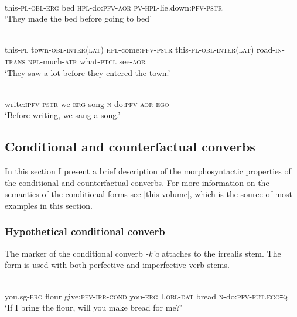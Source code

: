 ﻿\documentclass[output=paper]{langsci/langscibook}
\begin{document}
\ex \label{ex:8:18} %
\\
this-\textsc{pl}-\textsc{obl}-\textsc{erg} bed \textsc{hpl}-do:\textsc{pfv}-\textsc{aor} \textsc{pv}-\textsc{hpl}-lie.down:\textsc{pfv}-\textsc{pstr}\\
\glt `They made the bed before going to bed'

\ex \label{ex:8:19} %
\\
this-\textsc{pl} town-\textsc{obl}-\textsc{inter(lat)} \textsc{hpl}-come:\textsc{pfv}-\textsc{pstr} this-\textsc{pl}-\textsc{obl}-\textsc{inter}(\textsc{lat}) road-\textsc{in}-\textsc{trans} \textsc{npl}-much-\textsc{atr} what-\textsc{ptcl} see-\textsc{aor}\\
\glt `They saw a lot before they entered the town.'

\ex \label{ex:8:20} %
\\
write:\textsc{ipfv}-\textsc{pstr} we-\textsc{erg} song \textsc{n}-do:\textsc{pfv}-\textsc{aor}-\textsc{ego}\\
\glt `Before writing, we sang a song.'
\z

\subsection{Conditional and counterfactual converbs}

In this section I present a brief description of the morphosyntactic
properties of the conditional and counterfactual converbs. For more
information on the semantics of the conditional forms see \citet{dobrushina2019} [this volume],
which is the source of most examples in this section.

\subsubsection{Hypothetical conditional converb}

The marker of the conditional converb \emph{-k'a} attaches to the
irrealis stem. The form is used with both perfective and imperfective
verb stems.

\pagebreak

\ea \label{ex:8:21} %
\\
you.sg-\textsc{erg} flour give:\textsc{pfv}-\textsc{irr}-\textsc{cond} you-\textsc{erg} I.\textsc{obl}-\textsc{dat} bread \textsc{n}-do:\textsc{pfv}-\textsc{fut}.\textsc{ego}꞊\textsc{q}\\
\glt `If I bring the flour, will you make bread for me?'
\end{document}
